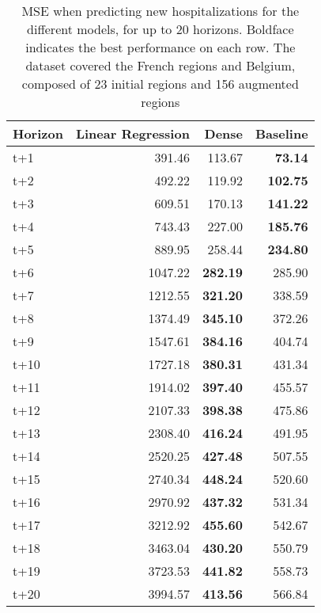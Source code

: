 \begin{table}[H]
\centering
\caption{MSE when predicting new hospitalizations for the different models, for up to 20 horizons. Boldface indicates the best performance on each row. The dataset covered the French regions and Belgium, composed of 23 initial regions and 156 augmented regions }
\label{tab:MSE_comparison}
\begin{tabular}{lrrr}
\toprule
Horizon &  Linear Regression &  Dense &  Baseline \\
\midrule
t+1  & 391.46  & 113.67  & \textbf{73.14}  \\
t+2  & 492.22  & 119.92  & \textbf{102.75}  \\
t+3  & 609.51  & 170.13  & \textbf{141.22}  \\
t+4  & 743.43  & 227.00  & \textbf{185.76}  \\
t+5  & 889.95  & 258.44  & \textbf{234.80}  \\
t+6  & 1047.22  & \textbf{282.19}  & 285.90  \\
t+7  & 1212.55  & \textbf{321.20}  & 338.59  \\
t+8  & 1374.49  & \textbf{345.10}  & 372.26  \\
t+9  & 1547.61  & \textbf{384.16}  & 404.74  \\
t+10  & 1727.18  & \textbf{380.31}  & 431.34  \\
t+11  & 1914.02  & \textbf{397.40}  & 455.57  \\
t+12  & 2107.33  & \textbf{398.38}  & 475.86  \\
t+13  & 2308.40  & \textbf{416.24}  & 491.95  \\
t+14  & 2520.25  & \textbf{427.48}  & 507.55  \\
t+15  & 2740.34  & \textbf{448.24}  & 520.60  \\
t+16  & 2970.92  & \textbf{437.32}  & 531.34  \\
t+17  & 3212.92  & \textbf{455.60}  & 542.67  \\
t+18  & 3463.04  & \textbf{430.20}  & 550.79  \\
t+19  & 3723.53  & \textbf{441.82}  & 558.73  \\
t+20  & 3994.57  & \textbf{413.56}  & 566.84  \\

\bottomrule
\end{tabular}
\end{table}
